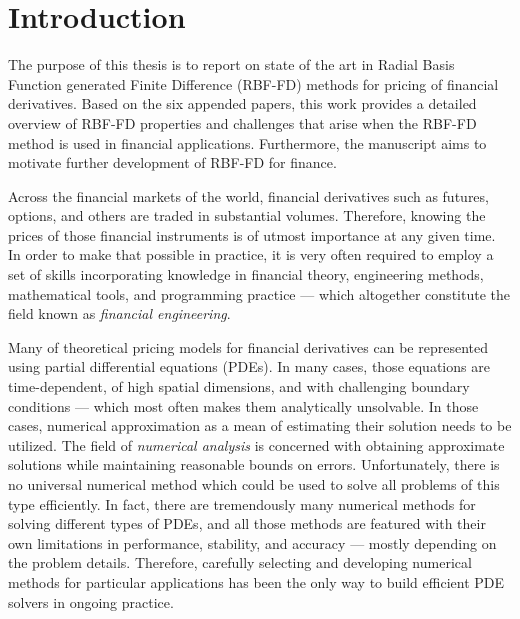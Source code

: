 \documentclass{UUThesisTemplate}
\begin{document}
\chapter{Introduction}
\label{ch:introduction}
\par The purpose of this thesis is to report on state of the art in Radial Basis Function generated Finite Difference (RBF-FD) methods for pricing of financial derivatives. Based on the six appended papers, this work provides a detailed overview of RBF-FD properties and challenges that arise when the RBF-FD method is used in financial applications. Furthermore, the manuscript aims to motivate further development of RBF-FD for finance.
\par Across the financial markets of the world, financial derivatives such as futures, options, and others are traded in substantial volumes. Therefore, knowing the prices of those financial instruments is of utmost importance at any given time. In order to make that possible in practice, it is very often required to employ a set of skills incorporating knowledge in financial theory, engineering methods, mathematical tools, and programming practice --- which altogether constitute the field known as \emph{financial engineering}. 
\par Many of theoretical pricing models for financial derivatives can be represented using partial differential equations (PDEs). In many cases, those equations are time-dependent, of high spatial dimensions, and with challenging boundary conditions --- which most often makes them analytically unsolvable. In those cases, numerical approximation as a mean of estimating their solution needs to be utilized. The field of \emph{numerical analysis} is concerned with obtaining approximate solutions while maintaining reasonable bounds on errors. Unfortunately, there is no universal numerical method which could be used to solve all problems of this type efficiently. In fact, there are tremendously many numerical methods for solving different types of PDEs, and all those methods are featured with their own limitations in performance, stability, and accuracy --- mostly depending on the problem details. Therefore, carefully selecting and developing numerical methods for particular applications has been the only way to build efficient PDE solvers in ongoing practice. 
\end{document}
